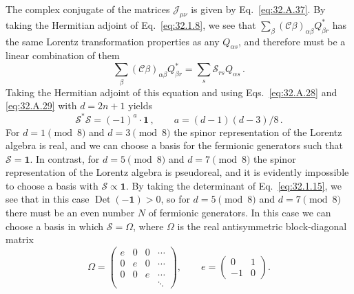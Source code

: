 The complex conjugate of the matrices \(\mathcal J_{\mu\nu}\) is given by
Eq.~\eqref{eq:32.A.37}. By taking the Hermitian adjoint of
Eq.~\eqref{eq:32.1.8}, we see that
\(\sum_\beta(\mathcal C\beta)_{\alpha\beta}Q_{\beta r}^*\) has the same
Lorentz transformation properties as any \(Q_{\alpha s}\), and therefore
must be a linear combination of them
\begin{equation}
  \sum_\beta(\mathcal C\beta)_{\alpha\beta}Q_{\beta r}^*
  =\sum_s\mathcal S_{rs}Q_{\alpha s}\,.
  \tag{32.1.14}\label{eq:32.1.14}
\end{equation}
Taking the Hermitian adjoint of this equation and using
Eqs.~\eqref{eq:32.A.28} and \eqref{eq:32.A.29} with \(d=2n+1\) yields
\begin{equation}
  \mathcal S^*\mathcal S=(-1)^a\mathbin{\cdot}\mathbf{1}\,,
  \qquad a=(d-1)(d-3)/8\,.
  \tag{32.1.15}\label{eq:32.1.15}
\end{equation}
For \(d=1\pmod 8\) and \(d=3\pmod 8\) the spinor representation of the
Lorentz algebra is real, and we can choose a basis for the fermionic
generators such that \(\mathcal S=\mathbf{1}\). In contrast, for
\(d=5\pmod 8\) and \(d=7\pmod 8\) the spinor representation of the Lorentz
algebra is pseudoreal, and it is evidently impossible to choose a basis
with \(\mathcal S\propto\mathbf{1}\). By taking the determinant of
Eq.~\eqref{eq:32.1.15}, we see that in this case
\(\operatorname{Det}(-\mathbf{1})>0\), so for \(d=5\pmod 8\) and
\(d=7\pmod 8\) there must be an even number \(N\) of fermionic generators.
In this case we can choose a basis in which \(\mathcal S=\Omega\), where
\(\Omega\) is the real antisymmetric block-diagonal matrix
\begin{equation}
  \Omega=
  \begin{pmatrix}
    e&0&0&\cdots\\
    0&e&0&\cdots\\
    0&0&e&\cdots\\
    &&&\ddots
  \end{pmatrix},
  \qquad
  e=
  \begin{pmatrix}
    0&1\\
    -1&0
  \end{pmatrix}.
  \tag{32.1.16}\label{eq:32.1.16}
\end{equation}

